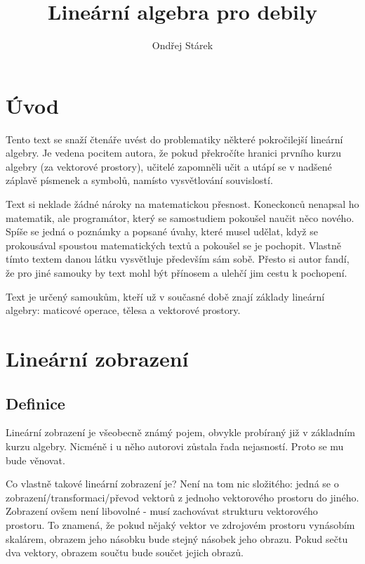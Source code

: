 \documentclass[a5paper,12pt]{amsbook}
\theoremstyle{definition}
\begin{document}
\title{Lineární algebra pro debily}
\author{Ondřej Stárek}
\maketitle

\chapter{Úvod}

\noindent Tento text se snaží čtenáře uvést do problematiky některé pokročilejší lineární algebry.
Je vedena pocitem autora, že pokud překročíte hranici prvního kurzu algebry (za vektorové
prostory), učitelé zapomněli učit a utápí se v nadšené záplavě písmenek a symbolů, namísto
vysvětlování souvislostí.

Text si neklade žádné nároky na matematickou přesnost. Koneckonců nenapsal ho matematik,
ale programátor, který se samostudiem pokoušel naučit něco nového. Spíše se jedná o poznámky
a popsané úvahy, které musel udělat, když se prokousával spoustou matematických textů
a pokoušel se je pochopit. Vlastně tímto textem danou látku vysvětluje především sám sobě.
Přesto si autor fandí, že pro jiné samouky by text mohl být přínosem a ulehčí jim cestu
k pochopení.

Text je určený samoukům, kteří už v současné době znají základy lineární algebry: maticové
operace, tělesa a vektorové prostory.

\chapter{Lineární zobrazení}

\section{Definice}

\noindent Lineární zobrazení je všeobecně známý pojem, obvykle probíraný již v základním kurzu
algebry. Nicméně i u něho autorovi zůstala řada nejasností. Proto se mu bude věnovat.

Co vlastně takové lineární zobrazení je? Není na tom nic složitého: jedná se
o zobrazení/transformaci/převod vektorů z jednoho vektorového prostoru do jiného. Zobrazení ovšem
není libovolné - musí zachovávat strukturu vektorového prostoru. To znamená, že pokud nějaký vektor
ve zdrojovém prostoru vynásobím skalárem, obrazem jeho násobku bude stejný násobek jeho obrazu. Pokud
sečtu dva vektory, obrazem součtu bude součet jejich obrazů. 
\end{document}
